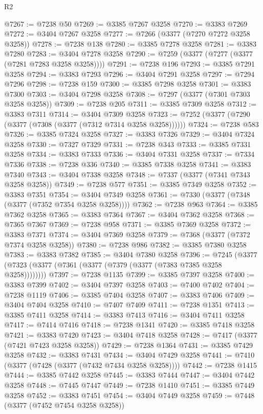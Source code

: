 \begin{lexlean}{R2}
\begin{coremodule}
@7267 := @7238 @50
@7269 := @3385 @7267 @3258
@7270 := @3383 @7269
@7272 := @3404 @7267 @3258
@7277 := @7266 (@3377 (@7270 @7272 @3258 @3258))
@7278 := @7238 @138
@7280 := @3385 @7278 @3258
@7281 := @3383 @7280
@7283 := @3404 @7278 @3258
@7290 := @7259 (@3377 (@7277 (@3377 (@7281 @7283 @3258 @3258))))
@7291 := @7238 @196
@7293 := @3385 @7291 @3258
@7294 := @3383 @7293
@7296 := @3404 @7291 @3258
@7297 := @7294 @7296
@7298 := @7238 @159
@7300 := @3385 @7298 @3258
@7301 := @3383 @7300
@7303 := @3404 @7298 @3258
@7308 := @7297 (@3377 (@7301 @7303 @3258 @3258))
@7309 := @7238 @205
@7311 := @3385 @7309 @3258
@7312 := @3383 @7311
@7314 := @3404 @7309 @3258
@7323 := @7252 (@3377 (@7290 (@3377 (@7308 (@3377 (@7312 @7314 @3258 @3258))))))
@7324 := @7238 @583
@7326 := @3385 @7324 @3258
@7327 := @3383 @7326
@7329 := @3404 @7324 @3258
@7330 := @7327 @7329
@7331 := @7238 @343
@7333 := @3385 @7331 @3258
@7334 := @3383 @7333
@7336 := @3404 @7331 @3258
@7337 := @7334 @7336
@7338 := @7238 @336
@7340 := @3385 @7338 @3258
@7341 := @3383 @7340
@7343 := @3404 @7338 @3258
@7348 := @7337 (@3377 (@7341 @7343 @3258 @3258))
@7349 := @7238 @577
@7351 := @3385 @7349 @3258
@7352 := @3383 @7351
@7354 := @3404 @7349 @3258
@7361 := @7330 (@3377 (@7348 (@3377 (@7352 @7354 @3258 @3258))))
@7362 := @7238 @963
@7364 := @3385 @7362 @3258
@7365 := @3383 @7364
@7367 := @3404 @7362 @3258
@7368 := @7365 @7367
@7369 := @7238 @958
@7371 := @3385 @7369 @3258
@7372 := @3383 @7371
@7374 := @3404 @7369 @3258
@7379 := @7368 (@3377 (@7372 @7374 @3258 @3258))
@7380 := @7238 @986
@7382 := @3385 @7380 @3258
@7383 := @3383 @7382
@7385 := @3404 @7380 @3258
@7396 := @7245 (@3377 (@7323 (@3377 (@7361 (@3377 (@7379 (@3377 (@7383 @7385 @3258 @3258))))))))
@7397 := @7238 @1135
@7399 := @3385 @7397 @3258
@7400 := @3383 @7399
@7402 := @3404 @7397 @3258
@7403 := @7400 @7402
@7404 := @7238 @1119
@7406 := @3385 @7404 @3258
@7407 := @3383 @7406
@7409 := @3404 @7404 @3258
@7410 := @7407 @7409
@7411 := @7238 @1351
@7413 := @3385 @7411 @3258
@7414 := @3383 @7413
@7416 := @3404 @7411 @3258
@7417 := @7414 @7416
@7418 := @7238 @1341
@7420 := @3385 @7418 @3258
@7421 := @3383 @7420
@7423 := @3404 @7418 @3258
@7428 := @7417 (@3377 (@7421 @7423 @3258 @3258))
@7429 := @7238 @1364
@7431 := @3385 @7429 @3258
@7432 := @3383 @7431
@7434 := @3404 @7429 @3258
@7441 := @7410 (@3377 (@7428 (@3377 (@7432 @7434 @3258 @3258))))
@7442 := @7238 @1415
@7444 := @3385 @7442 @3258
@7445 := @3383 @7444
@7447 := @3404 @7442 @3258
@7448 := @7445 @7447
@7449 := @7238 @1410
@7451 := @3385 @7449 @3258
@7452 := @3383 @7451
@7454 := @3404 @7449 @3258
@7459 := @7448 (@3377 (@7452 @7454 @3258 @3258))

\end{coremodule}
\end{lexlean}
